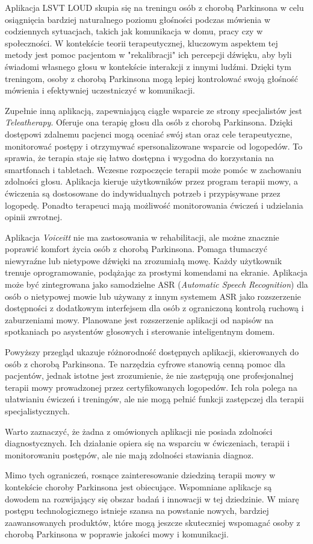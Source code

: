 Aplikacja LSVT LOUD skupia się na treningu osób z chorobą Parkinsona w celu osiągnięcia bardziej naturalnego poziomu głośności podczas mówienia
w codziennych sytuacjach, takich jak komunikacja w domu, pracy czy w społeczności.
W kontekście teorii terapeutycznej, kluczowym aspektem tej metody jest pomoc pacjentom w "rekalibracji" ich percepcji dźwięku, aby byli świadomi
własnego głosu w kontekście interakcji z innymi ludźmi.
Dzięki tym treningom, osoby z chorobą Parkinsona mogą lepiej kontrolować swoją głośność mówienia i efektywniej uczestniczyć w komunikacji.

Zupełnie inną aplikacją, zapewniającą ciągłe wsparcie ze strony specjalistów jest \emph{Teleatherapy}.
Oferuje ona terapię głosu dla osób z chorobą Parkinsona.
Dzięki dostępowi zdalnemu pacjenci mogą oceniać swój stan oraz cele terapeutyczne, monitorować postępy i otrzymywać spersonalizowane wsparcie od logopedów.
To sprawia, że terapia staje się łatwo dostępna i wygodna do korzystania na smartfonach i tabletach.
Wczesne rozpoczęcie terapii może pomóc w zachowaniu zdolności głosu.
Aplikacja kieruje użytkowników przez program terapii mowy, a ćwiczenia są dostosowane do indywidualnych potrzeb i przypisywane przez logopedę.
Ponadto terapeuci mają możliwość monitorowania ćwiczeń i udzielania opinii zwrotnej.

Aplikacja \emph{Voiceitt} nie ma zastosowania w rehabilitacji, ale możne znacznie poprawić komfort życia osób z chorobą Parkinsona.
Pomaga tłumaczyć niewyraźne lub nietypowe dźwięki na zrozumiałą mowę.
Każdy użytkownik trenuje oprogramowanie, podążając za prostymi komendami na ekranie.
Aplikacja może być zintegrowana jako samodzielne ASR (\emph{Automatic Speech Recognition}) dla osób o nietypowej mowie lub używany z innym systemem ASR
jako rozszerzenie dostępności z dodatkowym interfejsem dla osób z ograniczoną kontrolą ruchową i zaburzeniami mowy.
Planowane jest rozszerzenie aplikacji od napisów na spotkaniach po asystentów głosowych i sterowanie inteligentnym domem.

Powyższy przegląd ukazuje różnorodność dostępnych aplikacji, skierowanych do osób z chorobą Parkinsona.
Te narzędzia cyfrowe stanowią cenną pomoc dla pacjentów, jednak istotne jest zrozumienie, że nie zastępują one profesjonalnej terapii mowy prowadzonej
przez certyfikowanych logopedów.
Ich rola polega na ułatwianiu ćwiczeń i treningów, ale nie mogą pełnić funkcji zastępczej dla terapii specjalistycznych.

Warto zaznaczyć, że żadna z omówionych aplikacji nie posiada zdolności diagnostycznych.
Ich działanie opiera się na wsparciu w ćwiczeniach, terapii i monitorowaniu postępów, ale nie mają zdolności stawiania diagnoz.

Mimo tych ograniczeń, rosnące zainteresowanie dziedziną terapii mowy w kontekście choroby Parkinsona jest obiecujące.
Wspomniane aplikacje są dowodem na rozwijający się obszar badań i innowacji w tej dziedzinie.
W miarę postępu technologicznego istnieje szansa na powstanie nowych, bardziej zaawansowanych produktów, które mogą jeszcze skuteczniej wspomagać
osoby z chorobą Parkinsona w poprawie jakości mowy i komunikacji.
